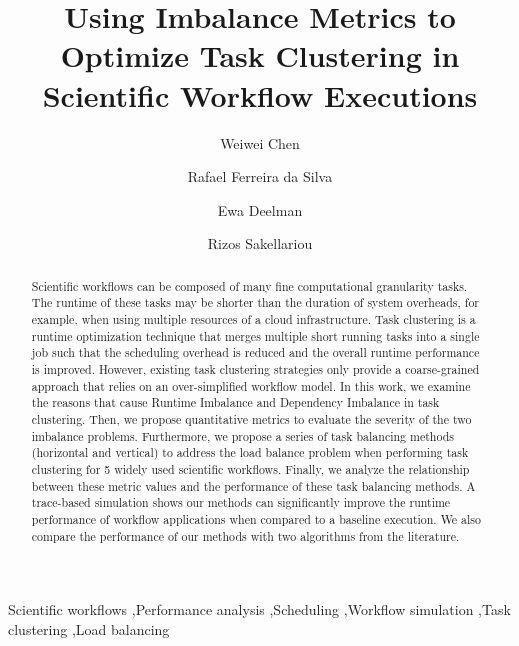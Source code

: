 \documentclass[final,5p,times,twocolumn]{elsarticle}
\begin{document}
\begin{frontmatter}

\title{Using Imbalance Metrics to Optimize Task Clustering in Scientific Workflow Executions}


\author[isi]{Weiwei Chen}

\author[isi]{Rafael Ferreira da Silva}

\author[isi]{Ewa Deelman}

\author[man]{Rizos Sakellariou}



\address[isi]{University of Southern California, Information Sciences Institute, Marina del Rey, CA, USA}
\address[man]{University of Manchester, School of Computer Science, Manchester, U.K.}


\begin{abstract}
Scientific workflows can be composed of many fine computational granularity tasks. The runtime of these tasks may be shorter than the duration of system overheads, for example, when using multiple resources of a cloud infrastructure. Task clustering is a runtime optimization technique that merges multiple short running tasks into a single job such that the scheduling overhead is reduced and the overall runtime performance is improved. However, existing task clustering strategies only provide a coarse-grained approach that relies on an over-simplified workflow model. In this work, we examine the reasons that cause Runtime Imbalance and Dependency Imbalance in task clustering. Then, we propose quantitative metrics to evaluate the severity of the two imbalance problems. Furthermore, we propose a series of task balancing methods (horizontal and vertical) to address the load balance problem when performing task clustering for 5 widely used scientific workflows. Finally, we analyze the relationship between these metric values and the performance of these task balancing methods. A trace-based simulation shows our methods can significantly improve the runtime performance of workflow applications when compared to a baseline execution. We also compare the performance of our methods with two algorithms from the literature.

\end{abstract}

\begin{keyword}
Scientific workflows \sep Performance analysis \sep Scheduling \sep Workflow simulation \sep Task clustering \sep Load balancing
\end{keyword}

\end{frontmatter}
\end{document}
